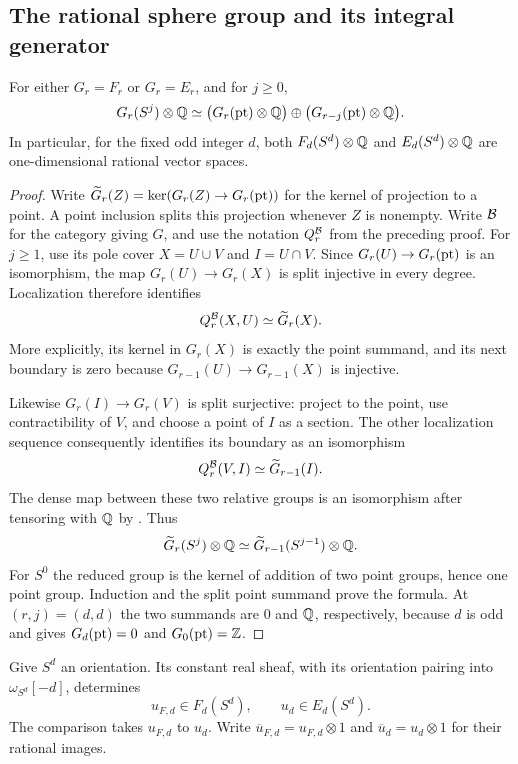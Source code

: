 \subsection{The rational sphere group and its integral generator}

\begin{proposition}
\label{prop:sphere-rank}
For either $G_r=F_r$ or $G_r=E_r$, and for $j\ge0$,
\[
 G_r(S^j)\otimes\mathbb Q\simeq
 \bigl(G_r(\mathrm{pt})\otimes\mathbb Q\bigr)
 \oplus\bigl(G_{r-j}(\mathrm{pt})\otimes\mathbb Q\bigr).
\]
In particular, for the fixed odd integer $d$, both
$F_d(S^d)\otimes\mathbb Q$ and $E_d(S^d)\otimes\mathbb Q$ are
one-dimensional rational vector spaces.
\end{proposition}

\begin{proof}
Write $\widetilde G_r(Z)=\ker(G_r(Z)\to G_r(\mathrm{pt}))$ for the
kernel of projection to a point.  A point inclusion splits this
projection whenever $Z$ is nonempty.
Write $\mathcal B$ for the category giving $G$, and use the notation
$Q_r^{\mathcal B}$ from the preceding proof.  For $j\ge1$, use its
pole cover $X=U\cup V$ and $I=U\cap V$.
Since $G_r(U)\to G_r(\mathrm{pt})$ is an isomorphism, the map
$G_r(U)\to G_r(X)$ is split injective in every degree.  Localization
therefore identifies
\[
 Q_r^{\mathcal B}(X,U)\simeq\widetilde G_r(X).
\]
More explicitly, its kernel in $G_r(X)$ is exactly the point
summand, and its next boundary is zero because
$G_{r-1}(U)\to G_{r-1}(X)$ is injective.

Likewise $G_r(I)\to G_r(V)$ is split surjective: project to the
point, use contractibility of $V$, and choose a point of $I$ as a
section.  The other localization sequence consequently identifies
its boundary as an isomorphism
\[
 Q_r^{\mathcal B}(V,I)\simeq\widetilde G_{r-1}(I).
\]
The dense map between these two relative groups is an isomorphism
after tensoring with $\mathbb Q$ by .  Thus
\[
 \widetilde G_r(S^j)\otimes\mathbb Q
 \simeq\widetilde G_{r-1}(S^{j-1})\otimes\mathbb Q.
\]
For $S^0$ the reduced group is the kernel of addition of two point
groups, hence one point group.  Induction and the split point
summand prove the formula.  At $(r,j)=(d,d)$ the two summands are
$0$ and $\mathbb Q$, respectively, because $d$ is odd and
 gives $G_d(\mathrm{pt})=0$ and $G_0(\mathrm{pt})=\mathbb Z$.
\end{proof}

Give $S^d$ an orientation.  Its constant real sheaf, with its
orientation pairing into $\omega_{S^d}[-d]$, determines
\[
 u_{F,d}\in F_d(S^d),\qquad u_d\in E_d(S^d).
\]
The comparison takes $u_{F,d}$ to $u_d$.  Write
$\overline{u}_{F,d}=u_{F,d}\otimes1$ and
$\overline{u}_d=u_d\otimes1$ for their rational images.

